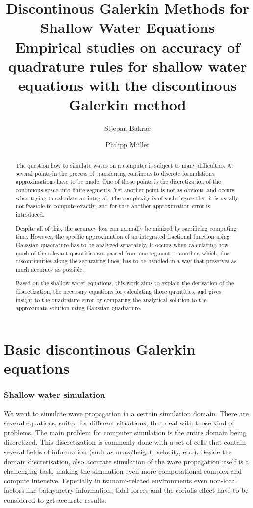 \documentclass{article}
\title{Discontinous Galerkin Methods for Shallow Water Equations\\
  \vspace{.2cm}
\small{Empirical studies on accuracy of quadrature rules for shallow water equations with the discontinous Galerkin method}
}
\author{Stjepan Bakrac \and Philipp M\"uller}
\date{}
\begin{document}
\maketitle{}

\begin{abstract}
  The question how to simulate waves on a computer is subject to many difficulties. At several points in the process of transferring continous to discrete formulations, approximations have to be made.
One of those points is the discretization of the continuous space into finite segments.%
Yet another point is not as obvious, and occurs when trying to calculate an integral. The complexity is of such degree that it is usually not feasible to compute exactly, and for that another approximation-error is introduced.

Despite all of this, the accuracy loss can normally be minized by sacrificing computing time.
However, the specific approximation of an integrated fractional function using Gaussian quadrature has to be analyzed separately.
It occurs when calculating how much of the relevant quantities are passed from one segment to another, which, due discontinuities along the separating lines, has to be handled in a way that preserves as much accuracy as possible.

Based on the shallow water equations, this work aims to explain the derivation of the discretization, the necessary equations for calculating those quantities, and gives insight to the quadrature error by comparing the analytical solution to the approximate solution using Gaussian quadrature.
\end{abstract}

\newpage
\setcounter{tocdepth}{2}
\tableofcontents{}

\newpage
\part{Basic discontinous Galerkin equations}
\label{part:introduction}

\section{Shallow water simulation}
\label{sec:problem-statement}

We want to simulate wave propagation in a certain simulation domain.
There are several equations, suited for different situations, that deal with those kind of problems.
The main problem  for computer simulation is the entire domain being discretized.
This discretization is commonly done with a set of cells that contain several fields of information (such as mass/height, velocity, etc.).
Beside the domain discretization, also accurate simulation of the wave propagation itself is a challenging task, making the simulation even more computational complex and compute intensive.
Especially in tsunami-related environments even non-local factors like bathymetry information, tidal forces and the coriolis effect have to be considered to get accurate results.
\end{document}
